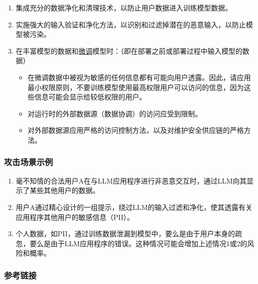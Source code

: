 \documentclass[
]{article}
\providecommand{\tightlist}{%
  \setlength{\itemsep}{0pt}\setlength{\parskip}{0pt}}
\begin{document}
\begin{enumerate}
\def\labelenumi{\arabic{enumi}.}
\tightlist
\item
  集成充分的数据净化和清理技术，以防止用户数据进入训练模型数据。
\item
  实施强大的输入验证和净化方法，以识别和过滤掉潜在的恶意输入，以防止模型被污染。
\item
  在丰富模型的数据和\href{https://github.com/OWASP/www-project-top-10-for-large-language-model-applications/wiki/Definitions}{微调}模型时：（即在部署之前或部署过程中输入模型的数据）

  \begin{itemize}
  \tightlist
  \item
    在微调数据中被视为敏感的任何信息都有可能向用户透露。因此，请应用最小权限原则，不要训练模型使用最高权限用户可以访问的信息，因为这些信息可能会显示给较低权限的用户。
  \item
    对运行时的外部数据源（数据协调）的访问应受到限制。
  \item
    对外部数据源应用严格的访问控制方法，以及对维护安全供应链的严格方法。
  \end{itemize}
\end{enumerate}

\subsubsection{攻击场景示例}\label{ux653bux51fbux573aux666fux793aux4f8b}

\begin{enumerate}
\def\labelenumi{\arabic{enumi}.}
\tightlist
\item
  毫不知情的合法用户A在与LLM应用程序进行非恶意交互时，通过LLM向其显示了某些其他用户的数据。
\item
  用户A通过精心设计的一组提示，绕过LLM的输入过滤和净化，使其透露有关应用程序其他用户的敏感信息（PII）。
\item
  个人数据，如PII，通过训练数据泄漏到模型中，要么是由于用户本身的疏忽，要么是由于LLM应用程序的错误。这种情况可能会增加上述情况1或2的风险和概率。
\end{enumerate}

\subsubsection{参考链接}\label{ux53c2ux8003ux94feux63a5}
\end{document}
